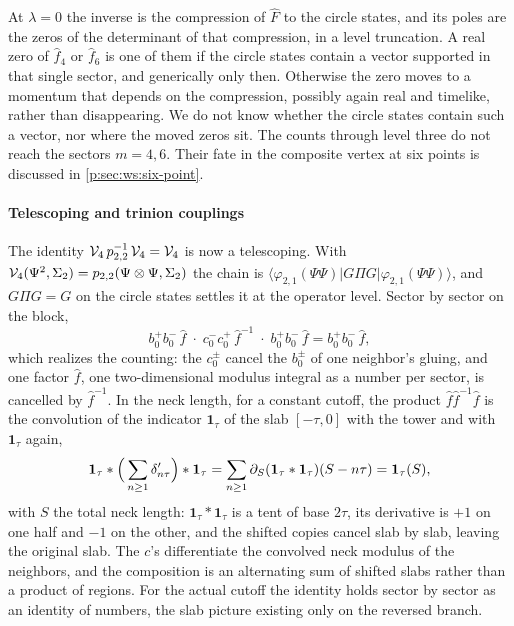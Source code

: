 At $\lambda = 0$ the inverse is the compression of $\hat F$ to the circle states, and its poles are the zeros of the determinant of that compression, in a level truncation.
A real zero of $\hat f_4$ or $\hat f_6$ is one of them if the circle states contain a vector supported in that single sector, and generically only then.
Otherwise the zero moves to a momentum that depends on the compression, possibly again real and timelike, rather than disappearing.
We do not know whether the circle states contain such a vector, nor where the moved zeros sit.
The counts through level three do not reach the sectors $m = 4, 6$.
Their fate in the composite vertex at six points is discussed in \cref{p:sec:ws:six-point}.

\paragraph{Telescoping and trinion couplings}
\label{p:sec:ws:telescoping}

The identity $\mathcal{V}_{4} \, p_{2,2}^{-1} \, \mathcal{V}_{4} = \mathcal{V}_{4}$ is now a telescoping.
With $\mathcal{V}_{4}(\Psi^2, \Sigma_2) = p_{2,2}(\Psi \otimes \Psi, \Sigma_2)$ the chain is $\langle \varphi_{2,1}(\Psi \Psi) | G \Pi G | \varphi_{2,1}(\Psi \Psi) \rangle$, and $G \Pi G = G$ on the circle states settles it at the operator level.
Sector by sector on the block,
\begin{equation}
  \label{p:eq:ws:identity-sectors}
  b_0^+ b_0^- \, \hat f \;\cdot\; c_0^- c_0^+ \, \hat f^{-1} \;\cdot\; b_0^+ b_0^- \, \hat f
    = b_0^+ b_0^- \, \hat f,
\end{equation}
which realizes the counting: the $c_0^\pm$ cancel the $b_0^\pm$ of one neighbor's gluing, and one factor $\hat f$, one two-dimensional modulus integral as a number per sector, is cancelled by $\hat f^{-1}$.
In the neck length, for a constant cutoff, the product $\hat f \hat f^{-1} \hat f$ is the convolution of the indicator $\mathbf 1_\tau$ of the slab $[- \tau, 0]$ with the tower and with $\mathbf 1_\tau$ again,
\begin{equation}
  \label{p:eq:ws:telescoping}
  \mathbf 1_\tau * \Big( \sum_{n \ge 1} \delta'_{n \tau} \Big) * \mathbf 1_\tau
    = \sum_{n \ge 1} \partial_S (\mathbf 1_\tau * \mathbf 1_\tau)(S - n \tau)
    = \mathbf 1_\tau(S),
\end{equation}
with $S$ the total neck length: $\mathbf 1_\tau * \mathbf 1_\tau$ is a tent of base $2 \tau$, its derivative is $+ 1$ on one half and $- 1$ on the other, and the shifted copies cancel slab by slab, leaving the original slab.
The $c$'s differentiate the convolved neck modulus of the neighbors, and the composition is an alternating sum of shifted slabs rather than a product of regions.
For the actual cutoff the identity holds sector by sector as an identity of numbers, the slab picture existing only on the reversed branch.

